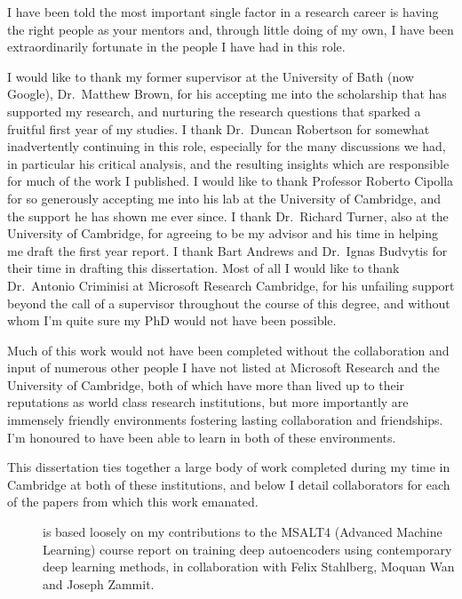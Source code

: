
\begin{acknowledgements}      
I have been told the most important single factor in a research career is having the right people as your mentors and, through little doing of my own, I have been extraordinarily fortunate in the people I have had in this role. 

I would like to thank my former supervisor at the University of Bath (now Google), Dr.~Matthew Brown, for his accepting me into the scholarship that has supported my research, and nurturing the research questions that sparked a fruitful first year of my studies. I thank Dr.~Duncan Robertson for somewhat inadvertently continuing in this role, especially for the many discussions we had, in particular his critical analysis, and the resulting insights which are responsible for much of the work I published. I would like to thank Professor Roberto Cipolla for so generously accepting me into his lab at the University of Cambridge, and the support he has shown me ever since. I thank Dr.~Richard Turner, also at the University of Cambridge, for agreeing to be my advisor and his time in helping me draft the first year report. I thank Bart Andrews and Dr.\ Ignas Budvytis for their time in drafting this dissertation. Most of all I would like to thank Dr.~Antonio Criminisi at Microsoft Research Cambridge, for his unfailing support beyond the call of a supervisor throughout the course of this degree, and without whom I'm quite sure my PhD would not have been possible.

Much of this work would not have been completed without the collaboration and input of numerous other people I have not listed at Microsoft Research and the University of Cambridge, both of which have more than lived up to their reputations as world class research institutions, but more importantly are immensely friendly environments fostering lasting collaboration and friendships. I'm honoured to have been able to learn in both of these environments.
\pagebreak

This dissertation ties together a large body of work completed during my time in Cambridge at both of these institutions, and below I detail collaborators for each of the papers from which this work emanated.

\begin{description}
	\item[] is based loosely on my contributions to the MSALT4 (Advanced Machine Learning) course report on training deep autoencoders using contemporary deep learning methods, in collaboration with Felix Stahlberg, Moquan Wan and Joseph Zammit.


\end{description}
\end{acknowledgements}
